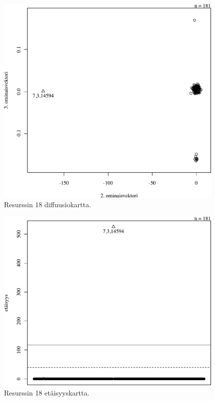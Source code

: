 \begin{figure}[p]
\centering
\includegraphics[width=11cm]{pics/diffuusiokuvat/service_18.pdf}
\caption{Resurssin 18 diffuusiokartta.}
\label{diffusio_18}
\end{figure}

\begin{figure}[p]
\centering
\includegraphics[width=11cm]{pics/tiheyskuvat/service_18.pdf}
\caption{Resurssin 18 etäisyyskartta.}
\label{service_18}
\end{figure}

